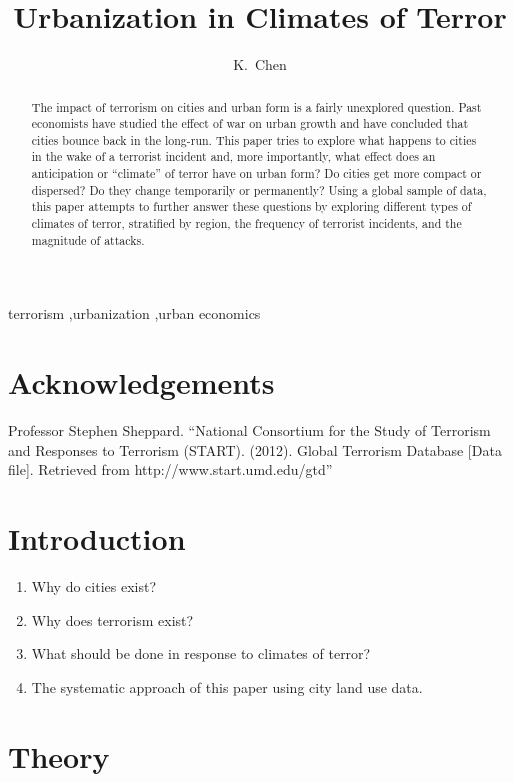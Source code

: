 \documentclass[preprint,2p,12pt]{elsarticle}
\begin{document}
\begin{frontmatter}
\title{Urbanization in Climates of Terror}
\author[kevin]{K.~Chen}
\address[kevin]{Williams College}

\begin{abstract}
The impact of terrorism on cities and urban form is a fairly unexplored question. Past economists have studied the effect of war on urban growth and have concluded that cities bounce back in the long-run. This paper tries to explore what happens to cities in the wake of a terrorist incident and, more importantly, what effect does an anticipation or ``climate'' of terror have on urban form? Do cities get more compact or dispersed? Do they change temporarily or permanently? Using a global sample of data, this paper attempts to further answer these questions by exploring different types of climates of terror, stratified by region, the frequency of terrorist incidents, and the magnitude of attacks.
\end{abstract}

\begin{keyword}
terrorism \sep urbanization \sep urban economics
\end{keyword}

\end{frontmatter}


\section*{Acknowledgements}
Professor Stephen Sheppard. ``National Consortium for the Study of Terrorism and Responses to Terrorism (START). (2012). Global Terrorism Database [Data file]. Retrieved from http://www.start.umd.edu/gtd''


\section{Introduction}
\begin{enumerate}
\item Why do cities exist?
\item Why does terrorism exist?
\item What should be done in response to climates of terror?
\item The systematic approach of this paper using city land use data.
\end{enumerate}

\section{Theory}
\end{document}
